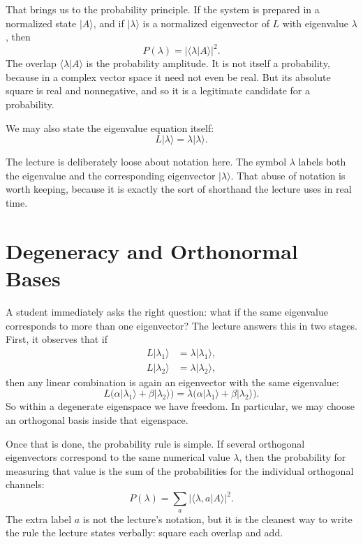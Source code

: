 That brings us to the probability principle. If the system is prepared in a normalized state \(|A\rangle\), and if \(|\lambda\rangle\) is a normalized eigenvector of \(L\) with eigenvalue \(\lambda\), then
\begin{equation}
P(\lambda)=|\langle \lambda|A\rangle|^2.
\end{equation}
The overlap \(\langle \lambda|A\rangle\) is the probability amplitude. It is not itself a probability, because in a complex vector space it need not even be real. But its absolute square is real and nonnegative, and so it is a legitimate candidate for a probability.

We may also state the eigenvalue equation itself:
\begin{equation}
L|\lambda\rangle=\lambda|\lambda\rangle.
\end{equation}

The lecture is deliberately loose about notation here. The symbol \(\lambda\) labels both the eigenvalue and the corresponding eigenvector \(|\lambda\rangle\). That abuse of notation is worth keeping, because it is exactly the sort of shorthand the lecture uses in real time.

\section{Degeneracy and Orthonormal Bases}

A student immediately asks the right question: what if the same eigenvalue corresponds to more than one eigenvector? The lecture answers this in two stages. First, it observes that if
\begin{align}
L|\lambda_1\rangle &= \lambda |\lambda_1\rangle,\\
L|\lambda_2\rangle &= \lambda |\lambda_2\rangle,
\end{align}
then any linear combination is again an eigenvector with the same eigenvalue:
\begin{equation}
L\bigl(\alpha|\lambda_1\rangle+\beta|\lambda_2\rangle\bigr)
=
\lambda\bigl(\alpha|\lambda_1\rangle+\beta|\lambda_2\rangle\bigr).
\end{equation}
So within a degenerate eigenspace we have freedom. In particular, we may choose an orthogonal basis inside that eigenspace.

Once that is done, the probability rule is simple. If several orthogonal eigenvectors correspond to the same numerical value \(\lambda\), then the probability for measuring that value is the sum of the probabilities for the individual orthogonal channels:
\begin{equation}
P(\lambda)=\sum_a |\langle \lambda,a|A\rangle|^2.
\end{equation}
The extra label \(a\) is not the lecture's notation, but it is the cleanest way to write the rule the lecture states verbally: square each overlap and add.

